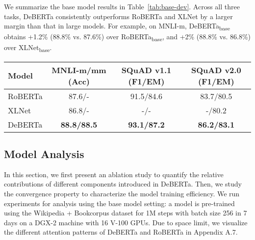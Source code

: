 \documentclass{article}
\newcommand\ModelName{DeBERTa}
\begin{document}
We summarize the base model results in Table~\ref{tab:base-dev}. 
Across all three tasks, {\ModelName} consistently outperforms RoBERTa and XLNet by a larger margin than that in large models.  
For example, on MNLI-m, {\ModelName\textsubscript{base}} obtains +1.2\%  (88.8\% vs. 87.6\%) over RoBERTa\textsubscript{base}, and +2\% (88.8\% vs. 86.8\%) over XLNet\textsubscript{base}.
\begin{table*}[htb!]
    \centering
    \begin{tabular}{@{\hskip2pt}l| c | c | c @{\hskip2pt}}
        \toprule
{\bf Model} &{MNLI-m/mm (Acc)} & {SQuAD v1.1 (F1/EM)} &{SQuAD v2.0 (F1/EM)}  \\ 
\midrule
RoBERTa & 87.6/- & 91.5/84.6 & 83.7/80.5  \\ \hline
        XLNet & 86.8/- & -/- & -/80.2  \\ \hline
        {\ModelName} & \textbf{88.8/88.5}  &\textbf{93.1/87.2} & \textbf{86.2/83.1}  \\
        \bottomrule
        \end{tabular}
    \caption{
    Results on MNLI in/out-domain (m/mm), SQuAD v1.1 and v2.0   development set. 
    }
    \label{tab:base-dev}
    \vspace{-3mm}
\end{table*}






\subsection{Model Analysis}
In this section, we first present an ablation study to quantify the relative contributions of different components introduced in {\ModelName}. 
Then, we study the convergence property to characterize the model training efficiency. 
We run experiments for analysis using the base model setting: a model is pre-trained using 
the Wikipedia + Bookcorpus dataset 
for 1M steps with batch size 256 
in 7 days on a DGX-2 machine with 16 V-100 GPUs.
Due to space limit, we visualize the different attention patterns of {\ModelName} and RoBERTa in Appendix A.7. 
\end{document}
